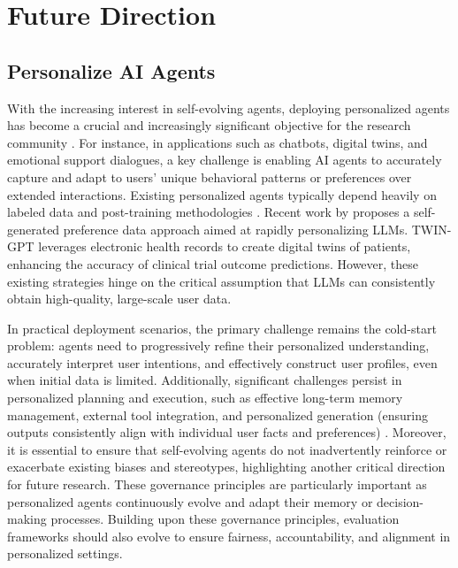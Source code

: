 \section{Future Direction}
\subsection{Personalize AI Agents}

With the increasing interest in self-evolving agents, deploying personalized agents has become a crucial and increasingly significant objective for the research community \citep{zhang2024personalization}. For instance, in applications such as chatbots, digital twins, and emotional support dialogues, a key challenge is enabling AI agents to accurately capture and adapt to users' unique behavioral patterns or preferences over extended interactions. Existing personalized agents typically depend heavily on labeled data and post-training methodologies \citep{cheng2024autopal}. Recent work by \cite{zhang2025personalize} proposes a self-generated preference data approach aimed at rapidly personalizing LLMs. TWIN-GPT \cite{wang2024twin} leverages electronic health records to create digital twins of patients, enhancing the accuracy of clinical trial outcome predictions. However, these existing strategies hinge on the critical assumption that LLMs can consistently obtain high-quality, large-scale user data.

In practical deployment scenarios, the primary challenge remains the cold-start problem: agents need to progressively refine their personalized understanding, accurately interpret user intentions, and effectively construct user profiles, even when initial data is limited. Additionally, significant challenges persist in personalized planning and execution, such as effective long-term memory management, external tool integration, and personalized generation (ensuring outputs consistently align with individual user facts and preferences) \citep{li2025survey}. Moreover, it is essential to ensure that self-evolving agents do not inadvertently reinforce or exacerbate existing biases and stereotypes, highlighting another critical direction for future research. 
These governance principles are particularly important as personalized agents continuously evolve and adapt their memory or decision-making processes. 
Building upon these governance principles, evaluation frameworks should also evolve to ensure fairness, accountability, and alignment in personalized settings.

